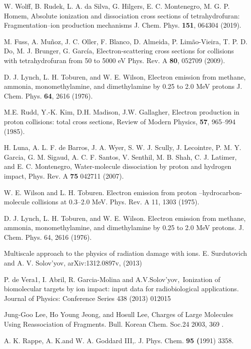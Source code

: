 \documentclass[preprint,12pt]{article}
\begin{document}
\begin{thebibliography}{99}
W. Wolff, B. Rudek, L. A. da Silva, G. Hilgers, E. C. Montenegro, 
M. G. P. Homem,
Absolute ionization and dissociation cross sections of tetrahydrofuran:
Fragmentation--ion production mechanisms
J. Chem. Phys. \textbf{151}, 064304 (2019).

M. Fuss, A. Muñoz, J. C. Oller, F. Blanco, D. Almeida, P. Limão-Vieira, 
T. P. D. Do, M. J. Brunger, G. García,
Electron-scattering cross sections for collisions with tetrahydrofuran 
from 50 to 5000 eV
Phys. Rev. A \textbf{80}, 052709 (2009).

D. J. Lynch, L. H. Toburen, and W. E. Wilson,
Electron emission from methane, ammonia, monomethylamine, and
dimethylamine by 0.25 to 2.0 MeV protons
J. Chem. Phys. \textbf{64}, 2616 (1976).

M.E. Rudd, Y.-K. Kim, D.H. Madison, J.W. Gallagher,
Electron production in proton collisions: total cross sections,
Review of Modern Physics, \textbf{57}, 965--994 (1985).

H. Luna, A. L. F. de Barros, J. A. Wyer, S. W. J. Scully, J. Lecointre, 
P. M. Y. Garcia, G. M. Sigaud, A. C. F. Santos, V. Senthil, M. B. Shah, 
C. J. Latimer, and E. C. Montenegro,
Water-molecule dissociation by proton and hydrogen impact,
Phys. Rev. A \textbf{75} 042711 (2007).


W. E. Wilson and L. H. Toburen. Electron emission from
proton --hydrocarbon-molecule collisions at 0.3--2.0 MeV. 
Phys. Rev. A 11, 1303 (1975).

D. J. Lynch, L. H. Toburen, and W. E. Wilson. Electron
emission from methane, ammonia, monomethylamine, and dimethylamine by 0.25
to 2.0 MeV protons. 
J. Chem. Phys. 64, 2616 (1976).

Multiscale approach to the physics of radiation
damage with ions. E. Surdutovich and A. V. Solov'yov, 
arXiv:1312.0897v, (2013)

P. de Vera1, I. Abril, R. Garcia-Molina and
A.V.Solov'yov,\ Ionization of biomolecular targets by ion impact: input data
for radiobiological applications. 
Journal of Physics: Conference Series 438
(2013) 012015

Jung-Goo Lee, Ho Young Jeong, and Hosull Lee, Charges of
Large Molecules Using Reassociation of Fragments. 
Bull. Korean Chem. Soc.24 2003, 369 .

A. K. Rappe, A. K.and W. A. Goddard III,. 
J. Phys. Chem. \textbf{95 (}1991) 3358.


\end{thebibliography}
\end{document}
